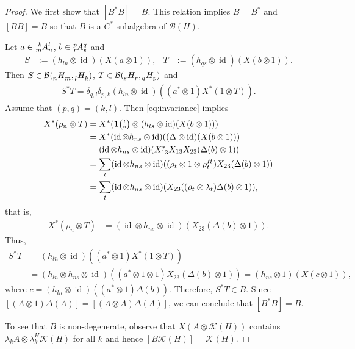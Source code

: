 \documentclass[11pt]{article}
\DeclareMathOperator{\id}{id}
\newcommand{\Grt}[3]{#1{\tiny {\begin{pmatrix} #2\\#3\end{pmatrix}}}}
\newcommand{\UnitC}[2]{\Grt{\mathbf{1}}{#1}{#2}}
\newcommand{\Gr}[5]{\tensor*[^{#2}_{#4}]{#1}{^{#3}_{#5}}}%
\newcommand{\Grd}[3]{\Gr{#1}{}{}{#2}{#3}}
\theoremstyle{definition}
\numberwithin{equation}{section}
\begin{document}
  \begin{proof}
We first show that $[B^{*}B]= B$. This relation implies $B=B^{*}$ and
$[BB]=B$ so that $B$ is a $C^{*}$-subalgebra of $\mathcal{B}(H)$. 

 Let $a\in \Gr{A}{k}{l}{m}{n}$, $b\in \Gr{A}{p}{q}{r}{s}$ and
 \begin{align*}
   S&:=(h_{ln} \otimes \id)(X(a\otimes 1)), &
   T&:=(h_{qs} \otimes \id)(X(b\otimes 1)).
 \end{align*}
Then  $S \in \mathcal{B}(\Grd{H}{n}{m},\Grd{H}{l}{k})$, $T\in
\mathcal{B}(\Grd{H}{s}{r},\Grd{H}{q}{p})$ and
\begin{align*}
  S^{*}T = \delta_{q,l}\delta_{p,k} (h_{ln} \otimes \id)((a^{*}\otimes
  1)X^{*}(1\otimes T)).
\end{align*}
Assume that $(p,q)=(k,l)$.  Then \eqref{eq:invariance} implies
\begin{align*}
 X^{*}(\rho_{n}\otimes T) &=  X^{*}(\UnitC{l}{n} \otimes (h_{ls} \otimes
  \id)(X(b\otimes 1))) \\
  &=  X^{*}(\id \otimes h_{ns}\otimes
  \id)((\Delta\otimes \id)(X(b\otimes 1))) \\
  &=    (\id \otimes h_{ns}\otimes
  \id)(X^{*}_{13}X_{13}X_{23}(\Delta(b)\otimes 1)) \\
  &= \sum_{t}(\id \otimes h_{ns} \otimes
  \id)((\rho_{t} \otimes 1\otimes \rho^{H}_{t})X_{23}(\Delta(b)\otimes
  1)) \\
&= \sum_{t}(\id \otimes h_{ns} \otimes
  \id)(X_{23}((\rho_{t}\otimes \lambda_{t})\Delta(b)\otimes
  1)), 
\end{align*}
that is,
\begin{align}\label{eq:corep-complemented}
  X^{*}(\rho_{n}\otimes T) &=
 (\id \otimes h_{ns} \otimes
  \id)(X_{23}(\Delta(b)\otimes 1)).
\end{align}
Thus,
\begin{align*}
  S^{*}T &= (h_{ln} \otimes \id)((a^{*}\otimes
  1)X^{*}(1\otimes T))  \\ &= (h_{ln} \otimes h_{ns} \otimes
  \id)((a^{*} \otimes 1\otimes 1)X_{23}(\Delta(b) \otimes 1)) 
  =(h_{ns} \otimes 1)(X(c\otimes 1)), 
\end{align*}
where $c=(h_{ln} \otimes \id)((a^{*}\otimes 1)\Delta(b))$. Therefore,
$S^{*}T \in B$. Since $[(A\otimes 1)\Delta(A)]=[(A\otimes
A)\Delta(A)]$, we can conclude that $[B^{*}B]=B$.


To see that $B$ is non-degenerate, observe that $X(A\otimes
\mathcal{K}(H))$ contains $\lambda_{k}A \otimes
\lambda_{k}^{H}\mathcal{K}(H)$ for all $k$ and hence
$[B\mathcal{K}(H)]=\mathcal{K}(H)$.


\end{proof}
\end{document}
